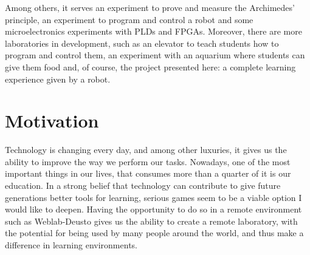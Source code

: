 Among others, it serves an experiment to prove and measure the Archimedes' principle, an experiment
to program and control a robot and some microelectronics experiments with PLDs and FPGAs. Moreover,
there are more laboratories in development, such as an elevator to teach students how to program and
control them, an experiment with an aquarium where students can give them food and, of course, the
project presented here: a complete learning experience given by a robot.

\section{Motivation}

Technology is changing every day, and among other luxuries, it gives us the ability to improve the
way we perform our tasks. Nowadays, one of the most important things in our lives, that consumes
more than a quarter of it is our education. In a strong belief that technology can contribute to
give future generations better tools for learning, serious games seem to be a viable option I would
like to deepen. Having the opportunity to do so in a remote environment such as Weblab-Deusto gives
us the ability to create a remote laboratory, with the potential for being used by many people
around the world, and thus make a difference in learning environments.
